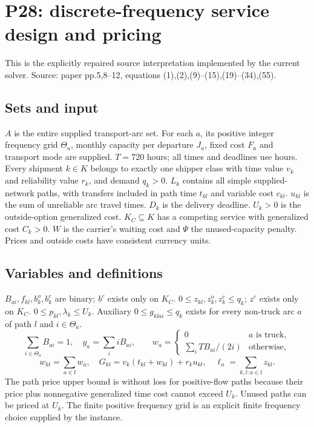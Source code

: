 \documentclass[11pt]{article}
\begin{document}
\section*{P28: discrete-frequency service design and pricing}
This is the explicitly repaired source interpretation implemented by the current
solver.
Source: paper pp.5,8--12, equations (1),(2),(9)--(15),(19)--(34),(55).

\subsection*{Sets and input}
$A$ is the entire supplied transport-arc set. For each $a$, its positive integer
frequency grid $\Theta_a$, monthly capacity per departure $J_a$, fixed cost $F_a$
and transport mode are supplied. $T=720$ hours; all times and deadlines use hours.
Every shipment $k\in K$ belongs to exactly one shipper class with time value $v_k$
and reliability value $r_k$, and demand $q_k>0$. $L_k$ contains all simple supplied-network
paths, with transfers included in path time $t_{kl}$ and variable cost $c_{kl}$.
$u_{kl}$ is the sum of unreliable arc travel times. $D_k$ is the delivery deadline.
$U_k>0$ is the outside-option generalized cost. $K_C\subseteq K$ has a competing
service with generalized cost $C_k>0$. $W$ is the carrier's waiting cost and $\Psi$
the unused-capacity penalty. Prices and outside costs have consistent currency units.

\subsection*{Variables and definitions}
$B_{ai},f_{kl},b_k^o,b_k^c$ are binary; $b^c$ exists only on $K_C$.
$0\le z_{kl},z_k^o,z_k^c\le q_k$; $z^c$ exists only on $K_C$.
$0\le p_{kl},\lambda_k\le U_k$. Auxiliary $0\le g_{klai}\le q_k$
exists for every non-truck arc $a$ of path $l$ and $i\in\Theta_a$.
\[
 \sum_{i\in\Theta_a} B_{ai}=1,\quad
 y_a=\sum_i i B_{ai},\qquad
 w_a=\begin{cases}0& a\text{ is truck},\\
 \sum_i T B_{ai}/(2i)&\text{otherwise},\end{cases}
\]
\[
 w_{kl}=\sum_{a\in l}w_a,\quad
 G_{kl}=v_k(t_{kl}+w_{kl})+r_k u_{kl},\quad
 \ell_a=\sum_{k,l:a\in l}z_{kl}.
\]
The path price upper bound is without loss for positive-flow paths because
their price plus nonnegative generalized time cost cannot exceed $U_k$.
Unused paths can be priced at $U_k$. The finite positive frequency grid is an
explicit finite frequency choice supplied by the instance.
\end{document}
